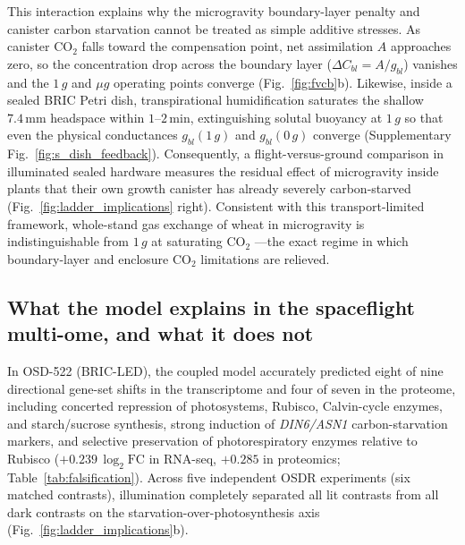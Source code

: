 \documentclass[preprint,11pt,numbers,sort&compress]{elsarticle}
\begin{document}
This interaction explains why the microgravity boundary-layer penalty and canister carbon starvation cannot be treated as simple additive stresses. As canister $\mathrm{CO_2}$ falls toward the compensation point, net assimilation $A$ approaches zero, so the concentration drop across the boundary layer ($\Delta C_{bl} = A/g_{bl}$) vanishes and the $1\,g$ and $\mu g$ operating points converge (Fig.~\ref{fig:fvcb}b). Likewise, inside a sealed BRIC Petri dish, transpirational humidification saturates the shallow $7.4\,\mathrm{mm}$ headspace within $1\text{--}2\,\mathrm{min}$, extinguishing solutal buoyancy at $1\,g$ so that even the physical conductances $g_{bl}(1\,g)$ and $g_{bl}(0\,g)$ converge (Supplementary Fig.~\ref{fig:s_dish_feedback}). Consequently, a flight-versus-ground comparison in illuminated sealed hardware measures the residual effect of microgravity inside plants that their own growth canister has already severely carbon-starved (Fig.~\ref{fig:ladder_implications} right). Consistent with this transport-limited framework, whole-stand gas exchange of wheat in microgravity is indistinguishable from $1\,g$ at saturating $\mathrm{CO_2}$ \citep{monje2005}---the exact regime in which boundary-layer and enclosure $\mathrm{CO_2}$ limitations are relieved.

\subsection{What the model explains in the spaceflight multi-ome, and what it does not}

In OSD-522 (BRIC-LED), the coupled model accurately predicted eight of nine directional gene-set shifts in the transcriptome and four of seven in the proteome, including concerted repression of photosystems, Rubisco, Calvin-cycle enzymes, and starch/sucrose synthesis, strong induction of \textit{DIN6/ASN1} carbon-starvation markers, and selective preservation of photorespiratory enzymes relative to Rubisco ($+0.239\,\log_2\mathrm{FC}$ in RNA-seq, $+0.285$ in proteomics; Table~\ref{tab:falsification}). Across five independent OSDR experiments (six matched contrasts), illumination completely separated all lit contrasts from all dark contrasts on the starvation-over-photosynthesis axis (Fig.~\ref{fig:ladder_implications}b).
\end{document}
